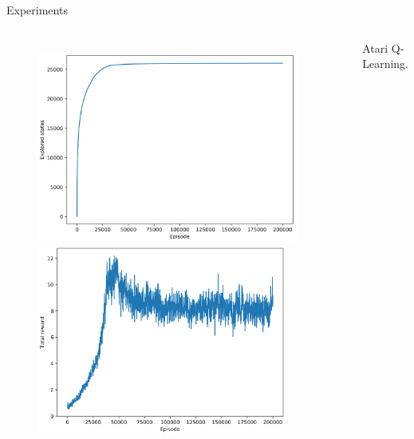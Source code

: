 \begin{frame}{Experiments}
    \begin{columns}[c,onlytextwidth]
            \begin{figure}
                \centering
                \includegraphics[width=0.94\textwidth]{images/atari-ql-explored-states.png}
                \includegraphics[width=0.9\textwidth]{images/atari-ql-total-reward.png}
            \end{figure}
            Atari Q-Learning.
    \end{columns}
\end{frame}


